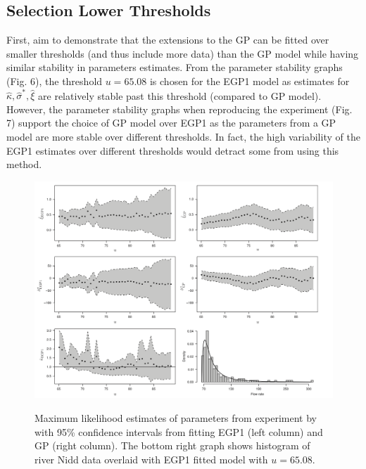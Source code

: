 \documentclass[12pt]{article}
\theoremstyle{definition}
\theoremstyle{definition}
\begin{document}
\subsection{Selection Lower Thresholds}
First, \cite{papatawn} aim to demonstrate that the extensions to the GP can be fitted over smaller thresholds (and thus include more data) than the GP model while having similar stability in parameters estimates. From the parameter stability graphs (Fig. 6), the threshold $u=65.08$ is chosen for the EGP1 model as estimates for $\hat \kappa, \hat \sigma^*, \hat \xi$ are relatively stable past this threshold (compared to GP model).  However, the parameter stability graphs when reproducing the experiment (Fig. 7) support the choice of GP model over EGP1 as the parameters from a GP model are more stable over different thresholds. In fact, the high variability of the EGP1 estimates over different thresholds would detract some from using this method. 
\begin{figure}[H]
\begin{center}
{\includegraphics[width=5.0in]{project/papafiles/fig5 papa.png}}
\caption{Maximum likelihood estimates of parameters from experiment by \cite{papatawn} with 95\% confidence intervals from fitting EGP1 (left column) and GP (right column). The bottom right graph shows histogram of river Nidd data overlaid with EGP1 fitted model with $u=65.08$.}
\end{center}
\end{figure}
\end{document}
